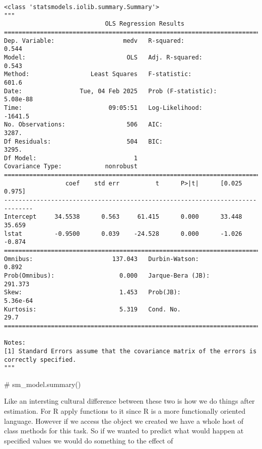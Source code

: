 \documentclass[
  letterpaper,
  DIV=11,
  numbers=noendperiod]{scrreprt}
\newenvironment{Shaded}{\begin{snugshade}}{\end{snugshade}}
\newcommand{\CommentTok}[1]{\textcolor[rgb]{0.37,0.37,0.37}{#1}}
\begin{document}
\begin{verbatim}
<class 'statsmodels.iolib.summary.Summary'>
"""
                            OLS Regression Results                            
==============================================================================
Dep. Variable:                   medv   R-squared:                       0.544
Model:                            OLS   Adj. R-squared:                  0.543
Method:                 Least Squares   F-statistic:                     601.6
Date:                Tue, 04 Feb 2025   Prob (F-statistic):           5.08e-88
Time:                        09:05:51   Log-Likelihood:                -1641.5
No. Observations:                 506   AIC:                             3287.
Df Residuals:                     504   BIC:                             3295.
Df Model:                           1                                         
Covariance Type:            nonrobust                                         
==============================================================================
                 coef    std err          t      P>|t|      [0.025      0.975]
------------------------------------------------------------------------------
Intercept     34.5538      0.563     61.415      0.000      33.448      35.659
lstat         -0.9500      0.039    -24.528      0.000      -1.026      -0.874
==============================================================================
Omnibus:                      137.043   Durbin-Watson:                   0.892
Prob(Omnibus):                  0.000   Jarque-Bera (JB):              291.373
Skew:                           1.453   Prob(JB):                     5.36e-64
Kurtosis:                       5.319   Cond. No.                         29.7
==============================================================================

Notes:
[1] Standard Errors assume that the covariance matrix of the errors is correctly specified.
"""
\end{verbatim}

\begin{Shaded}
\begin{Highlighting}[]

\CommentTok{\# sm\_model.summary()}
\end{Highlighting}
\end{Shaded}

Like an intersting cultural difference between these two is how we do
things after estimation. For R apply functions to it since R is a more
functionally oriented language. However if we access the object we
created we have a whole host of class methods for this task. So if we
wanted to predict what would happen at specified values we would do
something to the effect of
\end{document}
